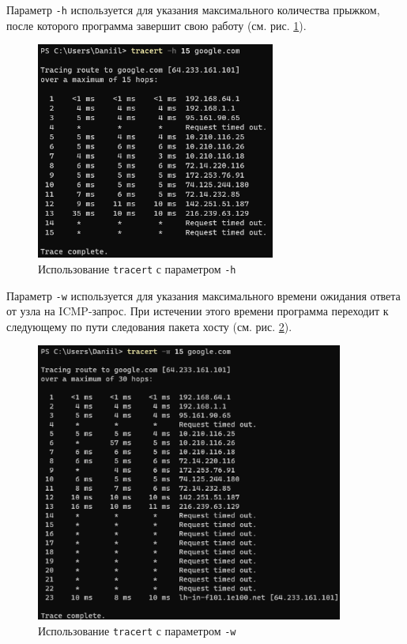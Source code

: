 \documentclass[a4paper, 14pt]{extarticle}
\begin{document}
Параметр \texttt{-h} используется для указания максимального количества
прыжком, после которого программа завершит свою работу (см. рис.
\ref{fig:tracert-hops}).

\begin{figure}[H]
  \centering
  \includegraphics[width=0.7\textwidth]{images/tracert/hops.png}
  \caption{Использование \texttt{tracert} с параметром \texttt{-h}}
  \label{fig:tracert-hops}
\end{figure}

Параметр \texttt{-w} используется для указания максимального времени ожидания
ответа от узла на ICMP-запрос. При истечении этого времени программа переходит
к следующему по пути следования пакета хосту (см. рис.
\ref{fig:tracert-timeout}).

\begin{figure}[H]
  \centering
  \includegraphics[width=0.9\textwidth]{images/tracert/timeout.png}
  \caption{Использование \texttt{tracert} с параметром \texttt{-w}}
  \label{fig:tracert-timeout}
\end{figure}
\end{document}
